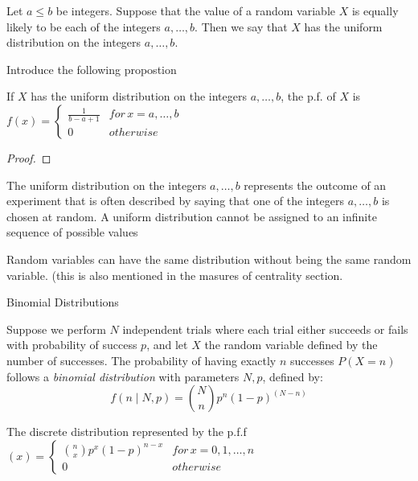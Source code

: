 \begin{definition}
Let $a \leq b$ be integers. Suppose that the value of a random variable $X$ is equally likely to be each of the integers $a, \ldots, b$. Then we say that $X$ has the uniform distribution on the integers $a, \ldots, b$.
\end{definition}

{\color{red} Introduce the following propostion}

\begin{proposition}
If $X$ has the uniform distribution on the integers $a,\ldots,b$, the p.f. of $X$ is $f\left(x\right)=\begin{cases}
\frac{1}{b-a+1} & for\,x=a,\ldots,b\\
0 & otherwise
\end{cases}$
\end{proposition}
\begin{proof}
\end{proof}

{\color{red} The uniform distribution on the integers $a, \ldots, b$ represents the outcome of an experiment that is often described by saying that one of the integers $a, \ldots, b$ is chosen at random. A uniform distribution cannot be assigned to an infinite sequence of possible values}

{\color{red} Random variables can have the same distribution without being the same random variable. (this is also mentioned in the masures of centrality section}.

Binomial Distributions

\begin{example}
Suppose we perform $N$ independent trials where each trial either succeeds or fails with probability of success $p$, and let $X$ the random variable defined by the number of successes. The probability of having exactly $n$ successes $P(X=n)$ follows a \emph{binomial distribution} with parameters $N, p$, defined by:
\[
f(n\mid N, p) = \binom{N}{n} p^n (1-p)^{(N-n)}
\]
\end{example}

\begin{definition}
The discrete distribution represented by the p.f.f $\left(x\right)=\begin{cases}
{n \choose x}p^{x}\left(1-p\right)^{n-x} & for\,x=0,1,\ldots,n\\
0 & otherwise
\end{cases}$
\end{definition}

